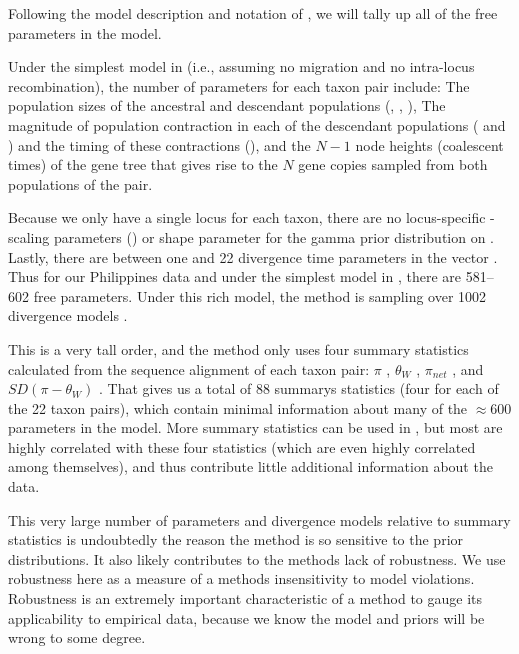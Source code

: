 \documentclass[letterpaper,12pt]{article}
\begin{document}
\begin{linenumbers}
Following the model description and notation of \citet{Oaks2012}, we
will tally up all of the free parameters in the \msb model.

Under the simplest model in \msb (i.e., assuming no migration and
no intra-locus recombination), the number of parameters for each
taxon pair include:
The population sizes of the ancestral and descendant populations
(\ancestralTheta{}, , ),
The magnitude of population contraction in each of the descendant
populations ( and ) and the
timing of these contractions (\bottleTime{}), and the $N-1$ node heights
(coalescent times) of the gene tree that gives rise to the $N$ gene
copies sampled from both populations of the pair.

Because we only have a single locus for each taxon, there are no locus-specific
\myTheta{}-scaling parameters (\locusMutationRateScalar{}) or
\locusRateHetShapeParameter shape parameter for the gamma prior distribution on
\locusMutationRateScalar{}.
Lastly, there are between one and 22 divergence time parameters \divt{} in
the vector \divtvector.
Thus for our Philippines data and under the simplest model in \msb, there are
581--602 free parameters.
Under this rich model, the method is sampling over 1002 divergence models
\citep[i.e., the number of integer partitions of $Y=22$][]{Oaks2012}.

This is a very tall order, and the method only uses four summary statistics
calculated from the sequence alignment of each taxon pair:
$\pi$ \citep{Tajima1983}, $\theta_W$
\citep{Watterson1975}, $\pi_{net}$ \citep{Takahata1985}, and
$SD(\pi-\theta_W)$ \citep{Tajima1989}.
That gives us a total of 88 summarys statistics (four for each of the 22 taxon
pairs), which contain minimal information about many of the $\approx 600$
parameters in the model.
More summary statistics can be used in \msb, but most are highly correlated
with these four statistics (which are even highly correlated among themselves),
and thus contribute little additional information about the data.

This very large number of parameters and divergence models relative to 
summary statistics is undoubtedly the reason the method is so sensitive
to the prior distributions.
It also likely contributes to the methods lack of robustness.
We use robustness here as a measure of a methods insensitivity to model
violations.
Robustness is an extremely important characteristic of a method to gauge its
applicability to empirical data, because we know the model and priors will be
wrong to some degree.


\end{linenumbers}
\end{document}
